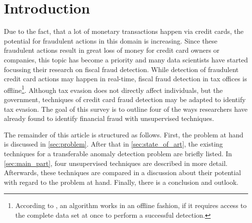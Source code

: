 \section{Introduction}
Due to the fact, that a lot of monetary transactions happen via credit cards, the potential for fraudulent actions in this domain is increasing. 
Since these fraudulent actions result in great loss of money for credit card owners or companies, this topic has become a priority and many data scientists have started focussing their research on fiscal fraud detection.
While detection of fraudulent credit card actions may happen in real-time, fiscal fraud detection in tax offices is offline\footnote{According to \cite{gruhl2022}, an algorithm works in an offline fashion, if it requires access to the complete data set at once to perform a successful detection.}. Although tax evasion does not directly affect individuals, but the government, techniques of credit card fraud detection may be adapted to identify tax evasion. 
The goal of this survey is to outline four of the ways researchers have already found to identify financial fraud with unsupervised techniques.

The remainder of this article is structured as follows. 
First, the problem at hand is discussed in \autoref{sec:problem}. After that in \autoref{sec:state_of_art}, the existing techniques for a transferable anomaly detection problem are briefly listed. In \autoref{sec:main_part}, four unsupervised techniques are described in more detail. Afterwards, these techniques are compared in a discussion about their potential with regard to the problem at hand. Finally, there is a conclusion and outlook.
